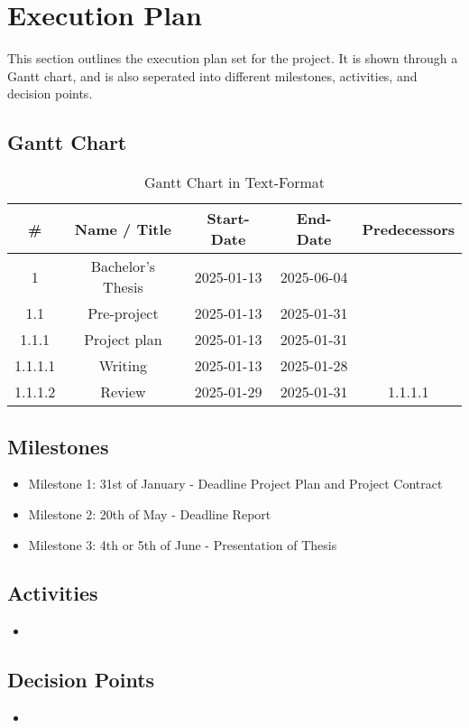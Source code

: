 \section{Execution Plan}

This section outlines the execution plan set for the project. It is shown through a Gantt chart, and is also seperated into different milestones, activities, and decision points.

\subsection{Gantt Chart}
\begin{comment}
    1. Terraform for OpenStack
    2. Docker
    3. Evt. Database

    https://app.teamgantt.com/projects/gantt?ids=4177546
\end{comment}

\begin{table}[H]
    \centering
    \begin{tabular}{|c|c|c|c|c|}
    \hline
    \# & Name / Title & Start-Date & End-Date & Predecessors \\
    \hline
    1 & Bachelor's Thesis & 2025-01-13 & 2025-06-04 & \\
    \hline
    1.1 & Pre-project & 2025-01-13 & 2025-01-31 & \\
    \hline
    1.1.1 & Project plan & 2025-01-13 & 2025-01-31 & \\
    \hline
    1.1.1.1 & Writing & 2025-01-13 & 2025-01-28 & \\
    \hline
    1.1.1.2 & Review & 2025-01-29 & 2025-01-31 & 1.1.1.1 \\
    \hline
    \end{tabular}
    \caption{Gantt Chart in Text-Format}
    \label{tab:gantt_text}
\end{table}



\subsection{Milestones}
\begin{itemize}
    \item Milestone 1: 31st of January - Deadline Project Plan and Project Contract
    \item Milestone 2: 20th of May - Deadline Report
    \item Milestone 3: 4th or 5th of June - Presentation of Thesis
\end{itemize}
\begin{comment}
    kanskje ha en egen deadline/goal om MVP etter et par sprints
    kan gjøre user testing med en MVP
    ish midten av mars
\end{comment}

\subsection{Activities}
\begin{itemize}
    \item 
\end{itemize}

\subsection{Decision Points}
\begin{itemize}
    \item 
\end{itemize}
